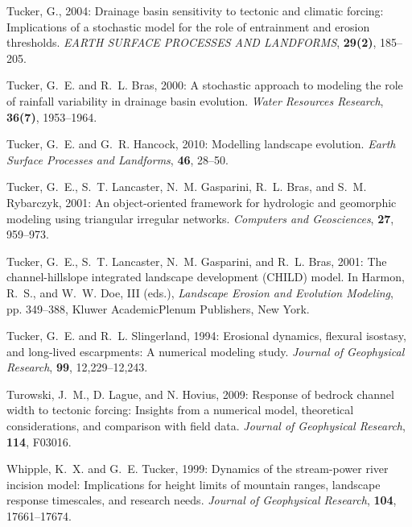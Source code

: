 \documentclass[12pt,reqno]{amsart}
\begin{document}
\begin{thebibliography}{41}
Tucker, G., {2004}: {Drainage basin sensitivity to tectonic and climatic
  forcing: Implications of a stochastic model for the role of entrainment and
  erosion thresholds}. {\em {EARTH SURFACE PROCESSES AND LANDFORMS}\/}, {\bf
  {29}({2})}, {185--205}.

Tucker, G.~E. and R.~L. Bras, 2000: A stochastic approach to modeling the role
  of rainfall variability in drainage basin evolution. {\em Water Resources
  Research\/}, {\bf 36(7)}, 1953--1964.

Tucker, G.~E. and G.~R. Hancock, 2010: Modelling landscape evolution. {\em
  Earth Surface Processes and Landforms\/}, {\bf 46}, 28--50.

Tucker, G.~E., S.~T. Lancaster, N.~M. Gasparini, R.~L. Bras, and S.~M.
  Rybarczyk, 2001: An object-oriented framework for hydrologic and geomorphic
  modeling using triangular irregular networks. {\em Computers and
  Geosciences\/}, {\bf 27}, 959--973.

Tucker, G.~E., S.~T. Lancaster, N.~M. Gasparini, and R.~L. Bras, 2001:
  The channel-hillslope integrated landscape development (CHILD)
  model. In Harmon, R.~S., and W.~W. Doe, III (eds.), {\em Landscape Erosion
  and Evolution Modeling\/}, pp. 349--388, Kluwer Academic\/Plenum
  Publishers, New York.

Tucker, G.~E. and R.~L. Slingerland, 1994: Erosional dynamics, flexural
  isostasy, and long-lived escarpments: A numerical modeling study. {\em
  Journal of Geophysical Research\/}, {\bf 99}, 12,229--12,243.

Turowski, J.~M., D. Lague, and N. Hovius, 2009: Response of bedrock
  channel width to tectonic forcing: Insights from a numerical model,
  theoretical considerations, and comparison with field data. {\em
  Journal of Geophysical Research\/}, {\bf 114}, F03016.

Whipple, K.~X. and G.~E. Tucker, 1999: Dynamics of the stream-power river
  incision model: Implications for height limits of mountain ranges, landscape
  response timescales, and research needs. {\em Journal of Geophysical
  Research\/}, {\bf 104}, 17661--17674.


\end{thebibliography}
\end{document}
